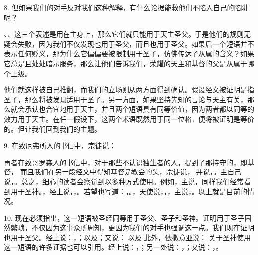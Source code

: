 8. 但如果我们的对手反对我们这种解释，有什么论据能救他们不陷入自己的陷阱呢？\par

、、这三个表述是用在主身上，那么它们就只能用于天主圣父。于是他们的规则无疑会失败，因为我们不仅发现也用于圣父，而且也用于圣父。如果后一个短语并不表示任何贬义，那为什么它偏偏要被限制用于圣子，仿佛传达了从属的含义？如果它总是且处处暗示服务，那么让他们告诉我们，荣耀的天主和基督的父是从属于哪个上级。\par

他们就这样被自己推翻，而我们的立场则从两方面得到确认。假设经文被证明是指圣子，那么将被发现适用于圣子。另一方面，如果坚持先知的言论与天主有关，那么就会承认也合宜地用于天主，并且两个短语具有同等价值，因为两者都以同等的效力用于天主。在任一假设下，这两个术语既然用于同一位格，便将被证明是等价的。但让我们回到我们的主题。\par

9. 在致厄弗所人的书信中，宗徒说： \par

再者在致哥罗森人的书信中，对于那些不认识独生者的人，提到了那持守的，即基督，  而且我们在另一段经文中得知基督是教会的头，宗徒说， 并说，。主自己说，。总之，细心的读者会察觉到以多种方式使用。例如，主说，同样我们经常看到用于圣神。，经上说，，。若望也写道：，。，天使说，，，主说，。以上就是目前的情况。\par

10. 现在必须指出，这一短语被圣经同等用于圣父、圣子和圣神。证明用于圣子固然繁琐，不仅因为这事众所周知，更因为我们的对手也强调这一点。我们现在证明也用于圣父。经上说：，；以及；又说： 以及 此外，依撒意亚说： 关于圣神使用这一短语的许多证据也可以引用。经上说：，；另一处说：，；又说：，。\par

